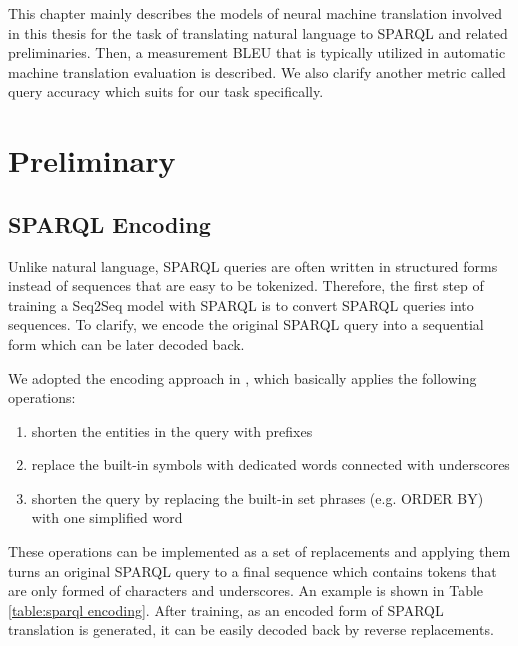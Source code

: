 
This chapter mainly describes the models of neural machine translation involved in this thesis for the task of translating natural language to SPARQL and related preliminaries. Then, a measurement BLEU that is typically utilized in automatic machine translation evaluation is described. We also clarify another metric called query accuracy which suits for our task specifically.

\section{Preliminary}

\subsection{SPARQL Encoding} \label{subsection:preprocessing}

Unlike natural language, SPARQL queries are often written in structured forms instead of sequences that are easy to be tokenized. Therefore, the first step of training a Seq2Seq model with SPARQL is to convert SPARQL queries into sequences. To clarify, we encode the original SPARQL query into a sequential form which can be later decoded back. 

We adopted the encoding approach in \cite{Soru2018a}, which basically applies the following operations:
\begin{enumerate}
\item shorten the entities in the query with prefixes
\item replace the built-in symbols with dedicated words connected with underscores
\item shorten the query by replacing the built-in set phrases (e.g. ORDER BY) with one simplified word
\end{enumerate}

These operations can be implemented as a set of replacements and applying them turns an original SPARQL query to a final sequence which contains tokens that are only formed of characters and underscores. An example is shown in Table \ref{table:sparql encoding}. After training, as an encoded form of SPARQL translation is generated, it can be easily decoded back by reverse replacements.

